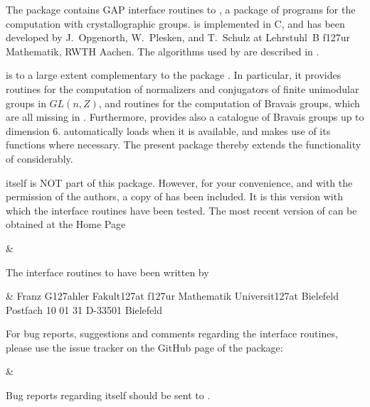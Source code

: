 

The package {\Carat} contains GAP interface routines to {\CARAT}, 
a package of programs for the computation with crystallographic
groups. {\CARAT} is implemented in C, and has been developed by
J.~Opgenorth, W.~Plesken, and T.~Schulz at Lehrstuhl~B f\accent127ur 
Mathematik, RWTH Aachen. The algorithms used by {\CARAT} are described 
in \cite{OPS98}. 

{\CARAT} is to a large extent complementary to the {\GAP} package
{\Cryst}. In particular, it provides routines for the computation 
of normalizers and conjugators of finite unimodular groups in $GL(n,Z)$,
and routines for the computation of Bravais groups, which are all 
missing in {\Cryst}.  Furthermore, {\CARAT} provides also a catalogue of 
Bravais groups up to dimension 6. {\Cryst} automatically loads {\CARAT}
when it is available, and makes use of its functions where necessary. 
The present package thereby extends the functionality of {\Cryst} 
considerably.

{\CARAT} itself is NOT part of this package. However, for your convenience,
and with the permission of the {\CARAT} authors, a copy of {\CARAT} 
has been included. It is this version with which the interface routines 
have been tested. The most recent version of {\CARAT} can be obtained at 
the {\CARAT} Home Page

\beginitems
&
\enditems
 
The {\GAP} interface routines to {\CARAT} have been written by

\beginitems
&
Franz G\accent127ahler\hfill\break
Fakult\accent127at f\accent127ur Mathematik\hfill\break
Universit\accent127at Bielefeld\hfill\break
Postfach 10 01 31\hfill\break
D-33501 Bielefeld\hfill\break
{}
\enditems

For bug reports, suggestions and comments regarding the interface routines, 
please use the issue tracker on the GitHub page of the package:

\beginitems
&
\enditems

Bug reports regarding {\CARAT} itself should be sent to
.

